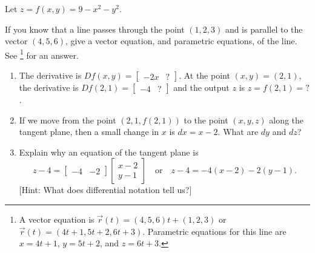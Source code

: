 \begin{problem}\label{tangent plane 9-x^2-y^2}%
%
%
 Let $z=f(x,y)=9-x^2-y^2$. 
\begin{review*}
 If you know that a line passes through the point $(1,2,3)$ and is parallel to the vector $(4,5,6)$, give a vector equation, and parametric equations, of the line. See \footnote{A vector equation is $\vec r(t) = (4,5,6)t+(1,2,3)$ or $\vec r(t) = (4t+1, 5t+2, 6t+3)$.  Parametric equations for this line are 
$x=4t+1$, $y=5t+2$, and $z=6t+3$. 
} for an answer.
\end{review*}


\begin{enumerate}
 \item The derivative is $Df(x,y) = \begin{bmatrix}-2x&?\end{bmatrix}$. At the point $(x,y)=(2,1)$, the derivative is $Df(2,1) = \begin{bmatrix}-4&?\end{bmatrix}$ and the output $z$ is $z=f(2,1)=?$.
 \item If we move from the point $(2,1,f(2,1))$ to the point $(x,y,z)$ along the tangent plane, then a small change in $x$ is $dx=x-2$. What are $dy$ and $dz$?
 \item Explain why an equation of the tangent plane is 
$$
z-4=\begin{bmatrix}-4 & -2 \end{bmatrix}\begin{bmatrix}x-2\\y-1\end{bmatrix} 
\quad \text{or}\quad 
z-4=-4(x-2)-2(y-1).$$ [Hint: What does differential notation tell us?]
\end{enumerate}
\end{problem}

